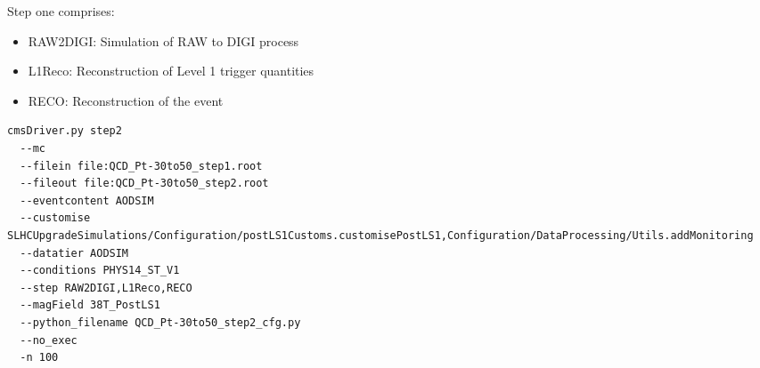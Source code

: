 \documentclass[a4paper]{article}
\begin{document}
Step one comprises:
\begin{itemize}
  \item RAW2DIGI: Simulation of RAW to DIGI process
  \item L1Reco: Reconstruction of Level 1 trigger quantities
  \item RECO: Reconstruction of the event
\end{itemize}

\begin{framed}
\begin{lstlisting}
cmsDriver.py step2 
  --mc 
  --filein file:QCD_Pt-30to50_step1.root 
  --fileout file:QCD_Pt-30to50_step2.root 
  --eventcontent AODSIM 
  --customise SLHCUpgradeSimulations/Configuration/postLS1Customs.customisePostLS1,Configuration/DataProcessing/Utils.addMonitoring 
  --datatier AODSIM 
  --conditions PHYS14_ST_V1 
  --step RAW2DIGI,L1Reco,RECO 
  --magField 38T_PostLS1 
  --python_filename QCD_Pt-30to50_step2_cfg.py 
  --no_exec 
  -n 100
\end{lstlisting}
\end{framed}

\newpage
\begin{thebibliography}{10}


\end{thebibliography}
\end{document}
